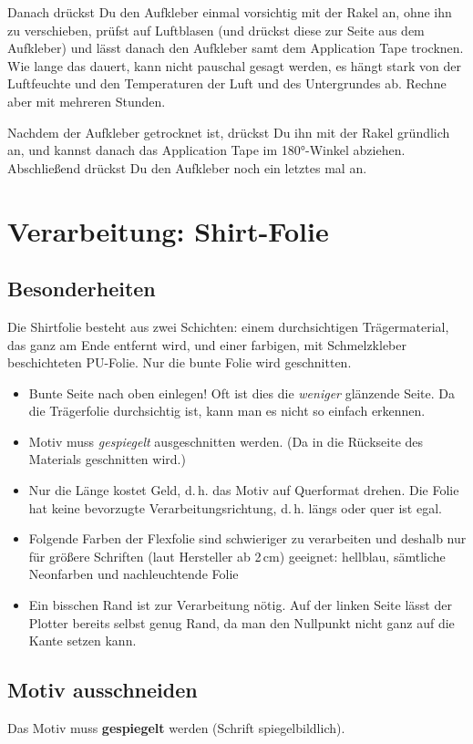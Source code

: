 \documentclass{\basedir/fablab-document}
\begin{document}
Danach drückst Du den Aufkleber einmal vorsichtig mit der Rakel an, ohne ihn zu verschieben, prüfst auf Luftblasen (und drückst diese zur Seite aus dem Aufkleber) und lässt danach den Aufkleber samt dem Application Tape trocknen.
Wie lange das dauert, kann nicht pauschal gesagt werden, es hängt stark von der Luftfeuchte und den Temperaturen der Luft und des Untergrundes ab.
Rechne aber mit mehreren Stunden.

Nachdem der Aufkleber getrocknet ist, drückst Du ihn mit der Rakel gründlich an, und kannst danach das Application Tape im 180°-Winkel abziehen.
Abschließend drückst Du den Aufkleber noch ein letztes mal an. 

\section{Verarbeitung: Shirt-Folie} \label{VerarbeitungShirtfolie}
\subsection{Besonderheiten}
Die Shirtfolie besteht aus zwei Schichten: einem durchsichtigen Trägermaterial, das ganz am Ende entfernt wird, und einer farbigen, mit Schmelzkleber beschichteten PU-Folie.
Nur die bunte Folie wird geschnitten.

\begin{itemize}
 \item Bunte Seite nach oben einlegen! Oft ist dies die \emph{weniger} glänzende Seite. Da die Trägerfolie durchsichtig ist, kann man es nicht so einfach erkennen.
 \item Motiv muss \emph{gespiegelt} ausgeschnitten werden. (Da in die Rückseite des Materials geschnitten wird.)
 \item Nur die Länge kostet Geld, d.\,h. das Motiv auf Querformat drehen. Die Folie hat keine bevorzugte Verarbeitungsrichtung, d.\,h. längs oder quer ist egal.
 \item Folgende Farben der Flexfolie sind schwieriger zu verarbeiten und deshalb nur für größere Schriften (laut Hersteller ab 2\,cm) geeignet: hellblau, sämtliche Neonfarben und nachleuchtende Folie
 \item Ein bisschen Rand ist zur Verarbeitung nötig. Auf der linken Seite lässt der Plotter bereits selbst genug Rand, da man den Nullpunkt nicht ganz auf die Kante setzen kann.
\end{itemize}

\subsection{Motiv ausschneiden}
Das Motiv muss \textbf{gespiegelt} werden (Schrift spiegelbildlich).
\end{document}
